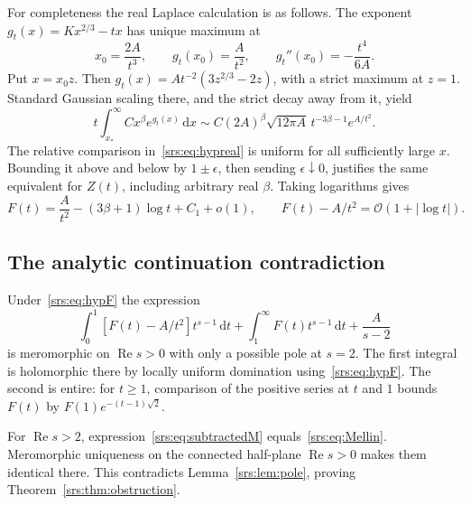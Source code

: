 \documentclass[11pt]{article}
\numberwithin{equation}{section}
\theoremstyle{remark}\newtheorem{remark}[theorem]{Remark}
\newcommand{\Oh}{\mathcal O}
\newcommand{\dd}{\,\mathrm d}
\DeclareMathOperator{\Ree}{Re}
\begin{document}
For completeness the real Laplace calculation is as follows. The exponent
$g_t(x)=Kx^{2/3}-tx$ has unique maximum at
\begin{equation}
 x_0=\frac{2A}{t^3},\qquad
 g_t(x_0)=\frac A{t^2},\qquad
 g_t''(x_0)=-\frac{t^4}{6A}.\label{srs:eq:Abeliansaddle}
\end{equation}
Put $x=x_0z$. Then $g_t(x)=At^{-2}(3z^{2/3}-2z)$, with a strict maximum at $z=1$. Standard Gaussian scaling there, and the strict decay away from it, yield
\begin{equation}
 t\int_{x_*}^\infty Cx^\beta e^{g_t(x)}\dd x
 \sim C(2A)^\beta\sqrt{12\pi A}\,
 t^{-3\beta-1}e^{A/t^2}.\label{srs:eq:Abelian}
\end{equation}
The relative comparison in~\eqref{srs:eq:hypreal} is uniform for all sufficiently large $x$. Bounding it above and below by $1\pm\epsilon$, then sending $\epsilon\downarrow0$, justifies the same equivalent for $Z(t)$, including arbitrary real $\beta$. Taking logarithms gives
\begin{equation}
 F(t)=\frac A{t^2}-(3\beta+1)\log t+C_1+o(1),\qquad
 F(t)-A/t^2=\Oh(1+|\log t|).\label{srs:eq:hypF}
\end{equation}

\subsection{The analytic continuation contradiction}
Under~\eqref{srs:eq:hypF} the expression
\begin{equation}
 \int_0^1 [F(t)-A/t^2]t^{s-1}\dd t
 +\int_1^\infty F(t)t^{s-1}\dd t+\frac A{s-2}
 \label{srs:eq:subtractedM}
\end{equation}
is meromorphic on $\Ree s>0$ with only a possible pole at $s=2$.
The first integral is holomorphic there by locally uniform domination using~\eqref{srs:eq:hypF}. The second is entire: for $t\ge1$, comparison of the positive series at $t$ and $1$ bounds $F(t)$ by $F(1)e^{-(t-1)\sqrt2}$.

For $\Ree s>2$, expression~\eqref{srs:eq:subtractedM} equals~\eqref{srs:eq:Mellin}. Meromorphic uniqueness on the connected half-plane $\Ree s>0$ makes them identical there. This contradicts Lemma~\ref{srs:lem:pole}, proving Theorem~\ref{srs:thm:obstruction}.
\end{document}
